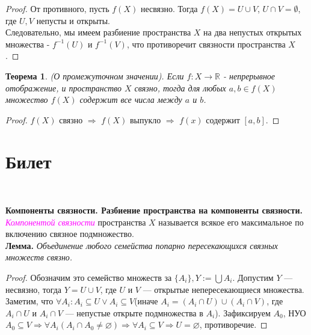 \documentclass[a4paper,100pt]{article}
\theoremstyle{indented}
\newtheorem{theorem}{Теорема}
\begin{document}
\begin{proof}
    От противного, пусть $f(X)$ несвязно. Тогда $f(X)=U\cup V$, $U\cap V = \emptyset$, где $U, V$ непусты и открыты.\\

    Следовательно, мы имеем разбиение пространства $X$ на два непустых открытых множества - $f^{-1}(U)$ и $f^{-1}(V)$, что противоречит связности пространства $X$.
\end{proof}

\begin{theorem}
    (О промежуточном значении). Если $f: X\rightarrow \mathbb{R}$ - непрерывное отображение, и пространство $X$ связно, тогда для любых $a, b\in f(X)$ множество $f(X)$ содержит все числа между $a$ и $b$.
\end{theorem}

\begin{proof}
    $f(X)$ связно $\Rightarrow$ $f(X)$ выпукло $\Rightarrow$ $f(x)$ содержит $[a,b]$.
\end{proof}

\section{Билет} \

\medskip

\textbf{Компоненты связности. Разбиение пространства на компоненты связности.}\\
    
    \textit{\textcolor{magenta}{Компонентой связности}} пространства $X$ называется всякое его максимальное по включению связное подмножество.\\
    
    \textbf{Лемма.} \textit{Объединение любого семейства попарно пересекающихся связных множеств связно.}
    
    \begin{proof}
        Обозначим это семейство множеств за $\{A_i\}, Y:=\bigcup A_i$. Допустим $Y$ --- несвязно, тогда $Y = U \cup V$, где $U$ и $V$ --- открытые непересекающиеся множества. Заметим, что $\forall A_i: A_i \subseteq U \vee A_i \subseteq V$(иначе $A_i = (A_i\cap U)\cup(A_i \cap V)$, где $A_i \cap U$ и $A_i \cap V$ --- непустые открыте подмножества в $A_i$). Зафиксируем $A_0$, НУО $A_0 \subseteq V \Rightarrow \forall A_i (A_i \cap A_0 \neq \varnothing) \Rightarrow \forall A_i \subseteq V \Rightarrow U = \varnothing$, противоречие.
    \end{proof}
    
\end{document}
